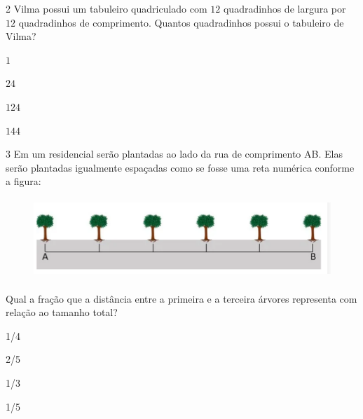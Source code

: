 \num{2}  Vilma possui um tabuleiro quadriculado com $12$ quadradinhos de largura
por $12$ quadradinhos de comprimento. Quantos quadradinhos possui o
tabuleiro de Vilma?

\begin{escolha}
\item $1$
\item $24$
\item $124$
\item $144$
\end{escolha}



\num{3}  Em um residencial serão plantadas ao lado da rua de comprimento AB.
Elas serão plantadas igualmente espaçadas como se fosse uma reta
numérica conforme a figura:


\begin{figure}
\centering\includegraphics[width=5in,height=1.19792in]{./imgSAEB_6_MAT/media/image109.png}
\end{figure}

Qual a fração que a distância entre a primeira e a terceira árvores
representa com relação ao tamanho total?

\begin{escolha}
\item 1/4
\item 2/5
\item 1/3
\item 1/5
\end{escolha}

